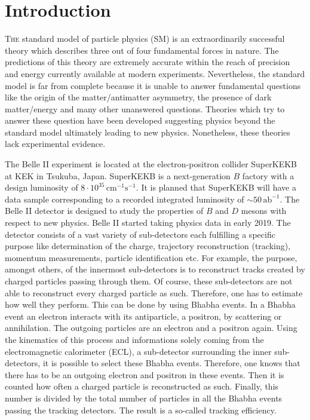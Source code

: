 \documentclass[a4paper,11pt,twosided,final,german,openbib,pdftex,listof=totoc,bibliography=totoc]{scrbook}
\begin{document}
\renewcommand\contentsname{Contents}
\renewcommand\figurename{Figure}
\renewcommand\tablename{Table}
\tableofcontents
\clearpage

\mainmatter
\sloppy





\chapter{Introduction}
\label{sec:Introduction}


\lettrine{T}{he} standard model of particle physics (SM) is an extraordinarily successful theory which describes three out of four fundamental forces in nature. The predictions of this theory are extremely accurate within the reach of precision and energy currently available at modern experiments. 
Nevertheless, the standard model is far from complete because it is unable to answer fundamental questions like the origin of the matter/antimatter asymmetry, the presence of dark matter/energy and many other unanswered questions. Theories which try to answer these question have been developed suggesting physics beyond the standard model ultimately leading to new physics. Nonetheless, these theories lack experimental evidence.
\newline

The Belle II experiment is located at the electron-positron collider SuperKEKB at KEK in Tsukuba, Japan. SuperKEKB is a next-generation $B$ factory with a design luminosity of $8\cdot 10^{35}\,\textrm{cm}^{-1}\textrm{s}^{-1}$. It is planned that SuperKEKB will have a data sample corresponding to a recorded integrated luminosity of $\sim 50\,\textrm{ab}^{-1}$. 
The Belle II detector is designed to study the properties of $B$ and $D$ mesons with respect to new physics. Belle II started taking physics data in early 2019. 
The detector consists of a vast variety of sub-detectors each fulfilling a specific purpose like determination of the charge, trajectory reconstruction (tracking), momentum measurements, particle identification etc. For example, the purpose, amongst others, of the innermost sub-detectors is to reconstruct tracks created by charged particles passing through them. Of course, these sub-detectors are not able to reconstruct every charged particle as such. Therefore, one has to estimate how well they perform. This can be done by using Bhabha events. 
In a Bhabha event an electron interacts with its antiparticle, a positron, by scattering or annihilation. The outgoing particles are an electron and a positron again. Using the kinematics of this process and informations solely coming from the electromagnetic calorimeter (ECL), a sub-detector surrounding the inner sub-detectors, it is possible to select these Bhabha events. Therefore, one knows that there has to be an outgoing electron and positron in these events. Then it is counted how often a charged particle is reconstructed as such. Finally, this number is divided by the total number of particles in all the Bhabha events passing the tracking detectors. The result is a so-called tracking efficiency.
\newline
\end{document}
